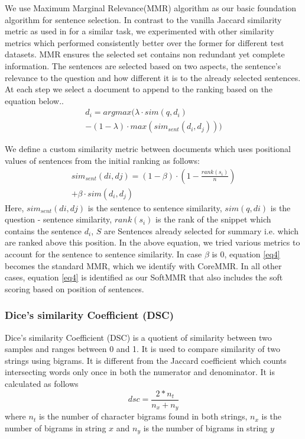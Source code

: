 \documentclass[11pt,a4paper]{article}
\begin{document}
We use Maximum Marginal Relevance(MMR) algorithm \cite{MMR} as our basic foundation algorithm for sentence selection. In contrast to the vanilla Jaccard similarity metric as used in \cite{khyati-paper} for a similar task, we experimented with other similarity metrics which performed consistently better over the former for different test datasets. MMR ensures the selected set contains non redundant yet complete information. The sentences are selected based on two aspects, the sentence's relevance to the question and how different it is to the already selected sentences. At each step we select a document to append to the ranking based on the equation below..
\begin{multline}
     d_i = argmax (\lambda \cdot sim(q, d_i)  \\  - (1 - \lambda) \cdot max(sim_{sent}(d_i, d_j) ) ) \label{eq4}
\end{multline}
   

 We define a custom similarity metric between documents which uses positional values of sentences from the initial ranking as follows:
\begin{multline}
  sim_{sent}(di, dj) = ( 1 - \beta) \cdot (1 - \frac{rank(s_i)}{n}) \\+ \beta \cdot sim(d_i, d_j) 
\end{multline}
Here, $sim_{sent}(di, dj)$ is the sentence to sentence similarity, $sim(q, di)$  is the question - sentence similarity, $rank(s_i)$ is the rank of the snippet which contains the sentence $d_i$, $S$ are Sentences already selected for summary i.e. which are ranked above this position. In the above equation, we tried various metrics to account for the sentence to sentence similarity. In case $\beta$ is 0, equation \ref{eq4} becomes the standard MMR, which we identify with CoreMMR. In all other cases, equation \ref{eq4} is identified as our SoftMMR that also includes the soft scoring based on position of sentences.

\subsubsection{Dice's similarity Coefficient (DSC)}

Dice's similarity Coefficient (DSC) \cite{dice} is a quotient of similarity between two samples and ranges between 0 and 1. It is used to compare similarity of two strings using bigrams. It is different from the Jaccard coefficient which counts intersecting words only once in both the numerator and denominator. It is calculated as follows 
\begin{equation}
    dsc = \frac{2 * n_t}{n_x + n_y}
\end{equation}
where $n_t$ is the number of character bigrams found in both strings, $n_x$ is the number of bigrams in string $x$ and $n_y$ is the number of bigrams in string $y$
\end{document}
